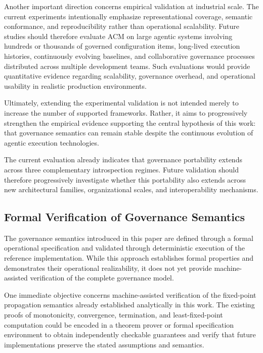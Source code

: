 \documentclass[10pt]{article}
\begin{document}
Another important direction concerns empirical validation at industrial scale. The current experiments intentionally emphasize representational coverage, semantic conformance, and reproducibility rather than operational scalability. Future studies should therefore evaluate ACM on large agentic systems involving hundreds or thousands of governed configuration items, long-lived execution histories, continuously evolving baselines, and collaborative governance processes distributed across multiple development teams. Such evaluations would provide quantitative evidence regarding scalability, governance overhead, and operational usability in realistic production environments.

Ultimately, extending the experimental validation is not intended merely to increase the number of supported frameworks. Rather, it aims to progressively strengthen the empirical evidence supporting the central hypothesis of this work: that governance semantics can remain stable despite the continuous evolution of agentic execution technologies.

The current evaluation already indicates that governance portability extends across three complementary introspection regimes. Future validation should therefore progressively investigate whether this portability also extends across new architectural families, organizational scales, and interoperability mechanisms.

\subsection{Formal Verification of Governance Semantics}
\label{sec:future_formal_verification}

The governance semantics introduced in this paper are defined through a formal operational specification and validated through deterministic execution of the reference implementation. While this approach establishes formal properties and demonstrates their operational realizability, it does not yet provide machine-assisted verification of the complete governance model.

One immediate objective concerns machine-assisted verification of the fixed-point propagation semantics already established analytically in this work. The existing proofs of monotonicity, convergence, termination, and least-fixed-point computation could be encoded in a theorem prover or formal specification environment to obtain independently checkable guarantees and verify that future implementations preserve the stated assumptions and semantics.
\end{document}
